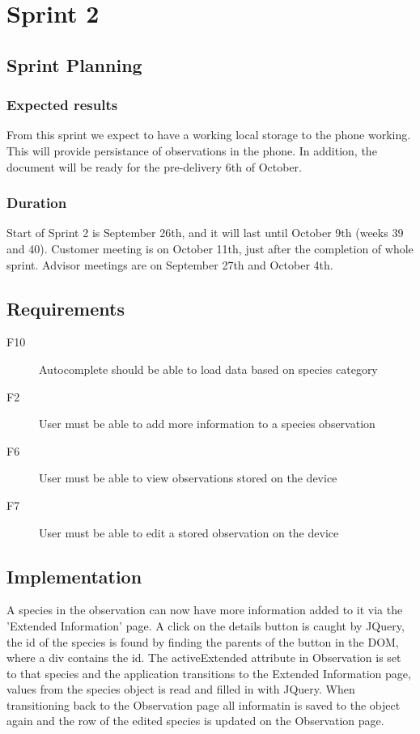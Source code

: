 \section{Sprint 2}

\subsection{Sprint Planning}

	\subsubsection{Expected results}
  From this sprint we expect to have a working local storage to the phone working. This will provide persistance of observations in the phone. In addition, the document will be ready for the pre-delivery 6th of October.
	
	\subsubsection{Duration}
	Start of Sprint 2 is September 26th, and it will last until October 9th (weeks 39 and 40). Customer meeting is on October 11th, just after the completion of whole sprint. Advisor meetings are on September 27th and October 4th.

\subsection{Requirements}

\begin{description}
	\item[F10] Autocomplete should be able to load data based on species category
	\item[F2] User must be able to add more information to a species observation
	\item[F6] User must be able to view observations stored on the device
	\item[F7] User must be able to edit a stored observation on the device
\end{description}

\subsection{Implementation}

A species in the observation can now have more information added to it via the 'Extended Information' page.
A click on the details button is caught by JQuery, the id of the species is found by finding the parents of the button in the DOM, where a div contains the id.
The activeExtended attribute in Observation is set to that species and the application transitions to the Extended Information page, values from the species object is read and filled in with JQuery. 
When transitioning back to the Observation page all informatin is saved to the object again and the row of the edited species is updated on the Observation page.

